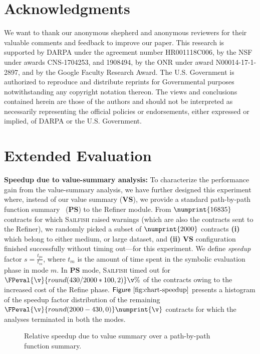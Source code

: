 \documentclass[conference, romanappendices]{tex/IEEEtran}
\theoremstyle{bfnote}
\newcommand{\toolname}{\textsc{Sailfish}\xspace}
\newcommand{\refine}{{\sc Refine}\xspace}
\newcommand{\refiner}{{\sc Refiner}\xspace}
\newcommand{\vsa}{{value-summary analysis}\xspace}
\let\num\numprint
\newcommand{\Fig}[1]{\ensuremath{\sf Figure~\ref{#1}}}
\newcommand{\clintStaticOnlyWarnings}{16835}
\newcommand{\clintSpeedupDataset}{2000}
\newcommand{\clintPathSummaryTimeout}{430}
\begin{document}
 	\section{Acknowledgments}
\label{sec:acknowledgement}
We want to thank our anonymous shepherd and anonymous reviewers for their valuable comments and feedback to improve our paper.
This research is supported by DARPA under the agreement number HR001118C006, by the NSF under awards CNS-1704253, and 1908494, by the ONR under award N00014-17-1-2897, and by the Google Faculty Research Award.
The U.S. Government is authorized to reproduce and distribute reprints for Governmental purposes notwithstanding any copyright notation thereon.
The views and conclusions contained herein are those of the authors
and should not be interpreted as necessarily representing the official policies or endorsements, either expressed or implied, of DARPA or the U.S. Government. 	
	
	 
	\appendices


\section{Extended Evaluation}
\label{app:extended_evaluation}
\noindent
\textbf{Speedup due to \vsa:}
To characterize the performance gain from the \vsa, we have further designed this experiment where, instead of our value summary (\textbf{VS}), we provide a standard path-by-path function summary~\cite{solar,Godefroid07,AnandGT08} (\textbf{PS}) to the \refiner module.
From $\num{\clintStaticOnlyWarnings}$ contracts for which \toolname raised warnings (which are also the contracts sent to the \refiner), we randomly picked a subset of $\num{\clintSpeedupDataset}$ contracts 
\textbf{(i)} which belong to either medium, or large dataset, and 
\textbf{(ii)} \textbf{VS} configuration finished successfully without timing out---for this experiment.
We define \textit{speedup} factor $s = \frac{t_{ps}}{t_{vs}}$, where $t_m$ is the amount of time spent in the symbolic evaluation phase in mode $m$.
In \textbf{PS} mode, \toolname timed out for $\FPeval{\v}{round(\clintPathSummaryTimeout/\clintSpeedupDataset*100,2)}\v\%$ of the contracts owing to the increased cost of the \refine phase.
\Fig{fig:chart-speedup} presents a histogram of the speedup factor distribution of the remaining $\FPeval{\v}{round(\clintSpeedupDataset-\clintPathSummaryTimeout,0)}\num{\v}$ contracts for which the analyses terminated in both the modes.
\begin{figure}[!t]
	\centering
	\setlength{\fboxsep}{0pt}\setlength{\fboxrule}{0.5pt}
	\caption{\small Relative speedup due to value summary over a path-by-path function summary.
	}
	\label{fig:chart-speedup}
	\vspace{-7mm}
\end{figure}
\end{document}
